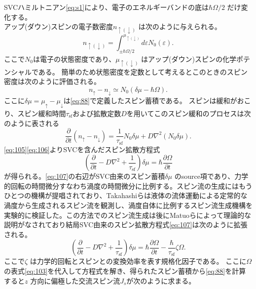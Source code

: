 \documentclass[dvipdfmx,11pt]{jsreport}
\numberwithin{equation}{chapter}
\numberwithin{table}{chapter}
\begin{document}
SVCハミルトニアン\eqref{eq:s1}により、電子のエネルギーバンドの底は$\hbar \Omega /2$ だけ変化する。\\アップ(ダウン)スピンの電子数密度$n_{\uparrow(\downarrow)}$
は次のように与えられる。
\begin{equation}
\label{eq:104}
	n_{\uparrow(\downarrow)}=\int_{\pm \hbar \Omega /2}^{\mu_{\uparrow(\downarrow)}} d\varepsilon N_0(\varepsilon)
.\end{equation}
ここで$ N_0$は電子の状態密度であり、$\mu_{\uparrow(\downarrow)}$ はアップ(ダウン)スピンの化学ポテンシャルである。
簡単のため状態密度を定数として考えるとこのときのスピン密度は次のように評価される。
\begin{equation}
\label{eq:105}
	n_{\uparrow}-n_{\downarrow}\simeq N_0(\delta\mu-\hbar \Omega)
.\end{equation}
ここに$\delta\mu=\mu_{\uparrow}-\mu_{\downarrow}$は\eqref{eq:88}で定義したスピン蓄積である。
スピンは緩和がおこり、スピン緩和時間$\tau_\text{sf} $および拡散定数$D$を用いてこのスピン緩和のプロセスは次のように表される
\begin{equation}
\label{eq:106}
	\frac{\partial }{\partial t} (n_{\uparrow}-n_{\downarrow})=\frac{1}{\tau_\text{sf} }N_0\delta\mu+D \nabla ^2(N_0\delta\mu)
.\end{equation}
\eqref{eq:105}\eqref{eq:106}よりSVCを含んだスピン拡散方程式
\begin{equation}
\label{eq:107}
\left( \frac{\partial }{\partial t} -D \nabla ^2+\frac{1}{\tau_\text{sf} } \right) \delta\mu=\hbar\frac{\partial  \Omega}{\partial t} 
\end{equation}
が得られる。\eqref{eq:107}の右辺がSVC由来のスピン蓄積$\delta\mu$ のsource項であり、力学的回転の時間微分すなわち渦度の時間微分に比例する。スピン流の生成にはもうひとつの機構が提唱されており、Takahashiらは液体の流体運動による定常的な渦度から生成されるスピン流を観測し、渦度自体に比例するスピン流生成機構を実験的に検証した\cite{TakahashiR2016Shg}。この方法でのスピン流生成は後にMatuoらによって理論的な説明がなされており結局SVC由来のスピン拡散方程式\eqref{eq:107}は次のように拡張される\cite{PhysRevB.102.174413,physrevb.96.020401}。
\begin{equation}
\label{eq:108}
\left( \frac{\partial }{\partial t} -D \nabla ^2+\frac{1}{\tau_\text{sf} } \right) \delta\mu=\hbar\frac{\partial \Omega}{\partial t} -\frac{\hbar}{\tau_\text{sf} }\zeta\Omega
.\end{equation}
ここで$\zeta$ は力学的回転とスピンとの変換効率を表す規格化因子である。
ここに$\Omega$ の表式\eqref{eq:103}を代入して方程式を解き、得られたスピン蓄積から\eqref{eq:88}を計算すると$z$ 方向に偏極した交流スピン流$J_s$が次のように求まる\cite{PhysRevLett.119.077202,PhysRevB.87.180402,PhysRevB.102.174413}。
\end{document}
